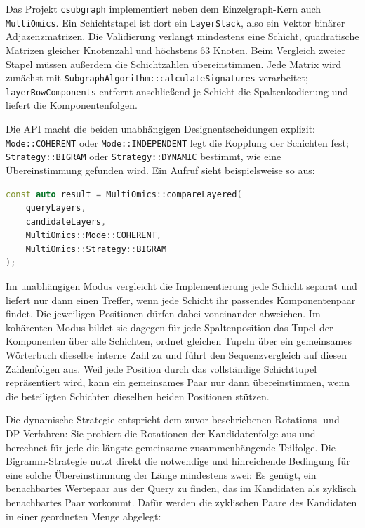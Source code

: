 \documentclass[a4paper,12pt, twoside]{report}
\theoremstyle{definition}
\begin{document}
Das Projekt \texttt{csubgraph} implementiert neben dem Einzelgraph-Kern auch \texttt{MultiOmics}. Ein Schichtstapel ist dort ein \texttt{LayerStack}, also ein Vektor binärer Adjazenzmatrizen. Die Validierung verlangt mindestens eine Schicht, quadratische Matrizen gleicher Knotenzahl und höchstens $63$ Knoten. Beim Vergleich zweier Stapel müssen außerdem die Schichtzahlen übereinstimmen. Jede Matrix wird zunächst mit \texttt{SubgraphAlgorithm::calculateSignatures} verarbeitet; \texttt{layerRowComponents} entfernt anschließend je Schicht die Spaltenkodierung und liefert die Komponentenfolgen.

Die API macht die beiden unabhängigen Designentscheidungen explizit: \texttt{Mode::COHERENT} oder \texttt{Mode::INDEPENDENT} legt die Kopplung der Schichten fest; \texttt{Strategy::BIGRAM} oder \texttt{Strategy::DYNAMIC} bestimmt, wie eine Übereinstimmung gefunden wird. Ein Aufruf sieht beispielsweise so aus:

\begin{lstlisting}[language=C++, caption={Aufruf des nativen mehrschichtigen Vergleichs}]
const auto result = MultiOmics::compareLayered(
    queryLayers,
    candidateLayers,
    MultiOmics::Mode::COHERENT,
    MultiOmics::Strategy::BIGRAM
);
\end{lstlisting}

Im unabhängigen Modus vergleicht die Implementierung jede Schicht separat und liefert nur dann einen Treffer, wenn jede Schicht ihr passendes Komponentenpaar findet. Die jeweiligen Positionen dürfen dabei voneinander abweichen. Im kohärenten Modus bildet sie dagegen für jede Spaltenposition das Tupel der Komponenten über alle Schichten, ordnet gleichen Tupeln über ein gemeinsames Wörterbuch dieselbe interne Zahl zu und führt den Sequenzvergleich auf diesen Zahlenfolgen aus. Weil jede Position durch das vollständige Schichttupel repräsentiert wird, kann ein gemeinsames Paar nur dann übereinstimmen, wenn die beteiligten Schichten dieselben beiden Positionen stützen.

Die dynamische Strategie entspricht dem zuvor beschriebenen Rotations- und DP-Verfahren: Sie probiert die Rotationen der Kandidatenfolge aus und berechnet für jede die längste gemeinsame zusammenhängende Teilfolge. Die Bigramm-Strategie nutzt direkt die notwendige und hinreichende Bedingung für eine solche Übereinstimmung der Länge mindestens zwei: Es genügt, ein benachbartes Wertepaar aus der Query zu finden, das im Kandidaten als zyklisch benachbartes Paar vorkommt. Dafür werden die zyklischen Paare des Kandidaten in einer geordneten Menge abgelegt:
\end{document}
